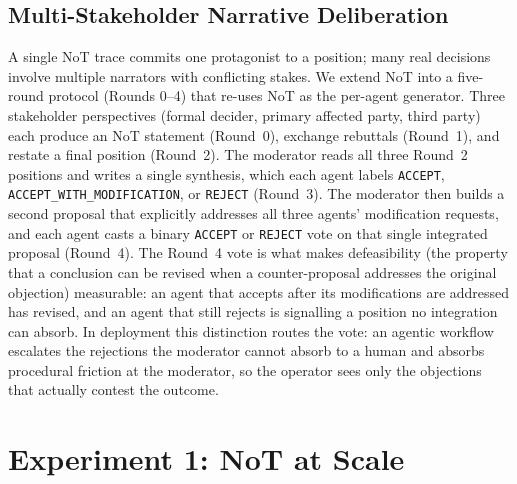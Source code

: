 \documentclass[11pt]{article}
\begin{document}
\subsection{Multi-Stakeholder Narrative Deliberation}
\label{sec:method-debate}

A single NoT trace commits one protagonist to a position; many real
decisions involve multiple narrators with conflicting stakes. We
extend NoT into a five-round protocol (Rounds 0--4) that re-uses
NoT as the per-agent generator. Three stakeholder perspectives
(formal decider, primary affected party, third party) each produce
an NoT statement (Round~0), exchange rebuttals (Round~1), and
restate a final position (Round~2). The moderator reads all three
Round~2 positions and writes a single synthesis, which each agent
labels \texttt{ACCEPT}, \texttt{ACCEPT\_WITH\_MODIFICATION}, or
\texttt{REJECT} (Round~3). The moderator then builds a second
proposal that explicitly addresses all three agents' modification
requests, and each agent casts a binary \texttt{ACCEPT} or
\texttt{REJECT} vote on that single integrated proposal (Round~4).
The Round~4 vote is what makes defeasibility (the property that a
conclusion can be revised when a counter-proposal addresses the
original objection) measurable: an agent that accepts after its
modifications are addressed has revised, and an agent that still
rejects is signalling a position no integration can absorb. In
deployment this distinction routes the vote: an agentic workflow
escalates the rejections the moderator cannot absorb to a human
and absorbs procedural friction at the moderator, so the operator
sees only the objections that actually contest the outcome.

\section{Experiment 1: NoT at Scale}
\label{sec:exp1}
\end{document}
